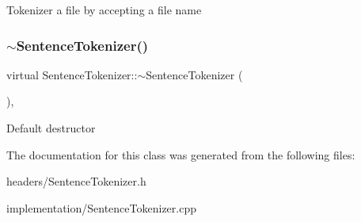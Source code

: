 Tokenizer a file by accepting a file name \mbox{\label{classSentenceTokenizer_a91bcdff9ff84fce9c56208c19254bdba}} 
\subsubsection{\texorpdfstring{$\sim$\+Sentence\+Tokenizer()}{~SentenceTokenizer()}}
{\footnotesize\ttfamily virtual Sentence\+Tokenizer\+::$\sim$\+Sentence\+Tokenizer (\begin{DoxyParamCaption}{ }\end{DoxyParamCaption})\hspace{0.3cm}{\ttfamily [inline]}, {\ttfamily [virtual]}}

Default destructor 

The documentation for this class was generated from the following files\+:\begin{DoxyCompactItemize}
\item 
headers/Sentence\+Tokenizer.\+h\item 
implementation/Sentence\+Tokenizer.\+cpp\end{DoxyCompactItemize}
